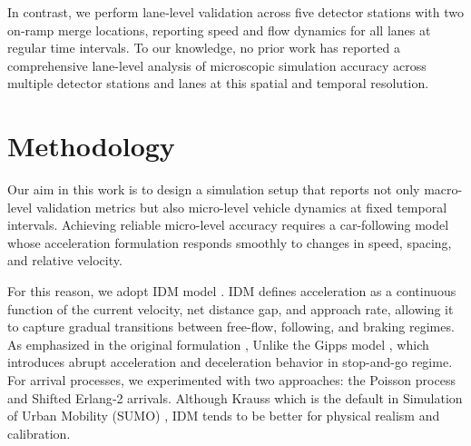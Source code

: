\documentclass{scspaperproc}
\theoremstyle{scsthe}
\begin{document}
In contrast, we perform lane‑level validation across five detector stations with two on‑ramp merge locations, reporting speed and flow dynamics for all lanes at regular time intervals. To our knowledge, no prior work has reported a comprehensive lane-level analysis of microscopic simulation accuracy across multiple detector stations and lanes at this spatial and temporal resolution.




\section{Methodology}
\label{sec:methodology}
Our aim in this work is to design a simulation setup that reports not only macro-level validation metrics but also micro-level vehicle dynamics at fixed temporal intervals. Achieving reliable micro-level accuracy requires
a car-following model whose acceleration formulation responds smoothly to changes in speed, spacing, and relative velocity.

For this reason, we adopt IDM model \cite{treiber2000congested}. IDM defines acceleration as a continuous function of the current velocity, net distance gap, and approach rate, allowing it to capture gradual transitions between free-flow, following, and braking regimes. As emphasized in the original formulation \cite{treiber2000congested}, Unlike the Gipps model \cite{gipps1981behavioural}, which introduces abrupt acceleration and deceleration behavior in stop-and-go regime. For arrival processes, we experimented with two approaches: the Poisson process and Shifted Erlang‑2 arrivals. 
Although Krauss which is the default in Simulation of Urban Mobility (SUMO) \cite{lopez2018microscopic}, IDM tends to be better for physical realism and calibration.
\end{document}
